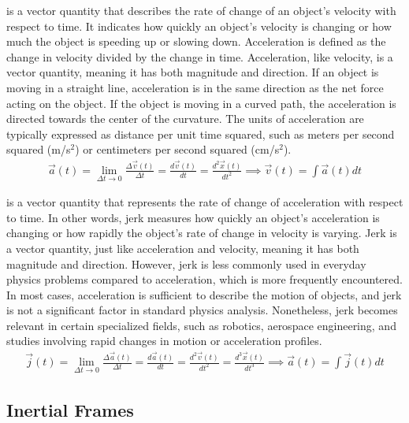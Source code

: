  is a vector quantity that describes the rate of change of an object's velocity with respect to time. It indicates how quickly an object's velocity is changing or how much the object is speeding up or slowing down. Acceleration is defined as the change in velocity divided by the change in time. Acceleration, like velocity, is a vector quantity, meaning it has both magnitude and direction. If an object is moving in a straight line, acceleration is in the same direction as the net force acting on the object. If the object is moving in a curved path, the acceleration is directed towards the center of the curvature. The units of acceleration are typically expressed as distance per unit time squared, such as meters per second squared (m/s$^2$) or centimeters per second squared (cm/s$^2$).
\begin{align}
\vec{a}(t)=\lim_{\Delta t \to 0}\frac{\Delta \vec{v}(t)}{\Delta t} = \frac{d\vec{v}(t)}{dt} = \frac{d^2\vec{x}(t)}{dt^2} \implies \vec{v}(t) = \int \vec{a}(t) dt
\end{align}

 is a vector quantity that represents the rate of change of acceleration with respect to time. In other words, jerk measures how quickly an object's acceleration is changing or how rapidly the object's rate of change in velocity is varying. Jerk is a vector quantity, just like acceleration and velocity, meaning it has both magnitude and direction. However, jerk is less commonly used in everyday physics problems compared to acceleration, which is more frequently encountered. In most cases, acceleration is sufficient to describe the motion of objects, and jerk is not a significant factor in standard physics analysis. Nonetheless, jerk becomes relevant in certain specialized fields, such as robotics, aerospace engineering, and studies involving rapid changes in motion or acceleration profiles.
\begin{align}
\vec{j}(t)=\lim_{\Delta t \to 0}\frac{\Delta \vec{a}(t)}{\Delta t} = \frac{d\vec{a}(t)}{dt} = \frac{d^2\vec{v}(t)}{dt^2} = \frac{d^3\vec{x}(t)}{dt^3} \implies \vec{a}(t) = \int \vec{j}(t) dt
\end{align}

\subsection{Inertial Frames}

